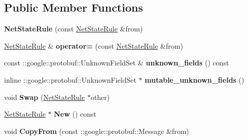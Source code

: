 \subsection*{Public Member Functions}
\begin{DoxyCompactItemize}
\item 
\mbox{\label{classcaffe_1_1_net_state_rule_a0d2c409a9d9757ba193831dbf2aeb463}} 
{\bfseries Net\+State\+Rule} (const \mbox{\hyperlink{classcaffe_1_1_net_state_rule}{Net\+State\+Rule}} \&from)
\item 
\mbox{\label{classcaffe_1_1_net_state_rule_afe65d268b02f0cd2a4a8a9fd8ac134da}} 
\mbox{\hyperlink{classcaffe_1_1_net_state_rule}{Net\+State\+Rule}} \& {\bfseries operator=} (const \mbox{\hyperlink{classcaffe_1_1_net_state_rule}{Net\+State\+Rule}} \&from)
\item 
\mbox{\label{classcaffe_1_1_net_state_rule_a0cb22959c6c137df42557263ab6a7930}} 
const \+::google\+::protobuf\+::\+Unknown\+Field\+Set \& {\bfseries unknown\+\_\+fields} () const
\item 
\mbox{\label{classcaffe_1_1_net_state_rule_a53244da02e82d8be0fc48e100b183b52}} 
inline \+::google\+::protobuf\+::\+Unknown\+Field\+Set $\ast$ {\bfseries mutable\+\_\+unknown\+\_\+fields} ()
\item 
\mbox{\label{classcaffe_1_1_net_state_rule_a5e012fd32d19636a3736312dbea9c3c9}} 
void {\bfseries Swap} (\mbox{\hyperlink{classcaffe_1_1_net_state_rule}{Net\+State\+Rule}} $\ast$other)
\item 
\mbox{\label{classcaffe_1_1_net_state_rule_a3d6393a410e6aa069d048559b11e6ce0}} 
\mbox{\hyperlink{classcaffe_1_1_net_state_rule}{Net\+State\+Rule}} $\ast$ {\bfseries New} () const
\item 
\mbox{\label{classcaffe_1_1_net_state_rule_ac1e672b74c39e355c39bbf4c96becf3a}} 
void {\bfseries Copy\+From} (const \+::google\+::protobuf\+::\+Message \&from)
\item 
\mbox{\label{classcaffe_1_1_net_state_rule_ab0c515f271bf3b200704878e5975d844}} 

\end{DoxyCompactItemize}
